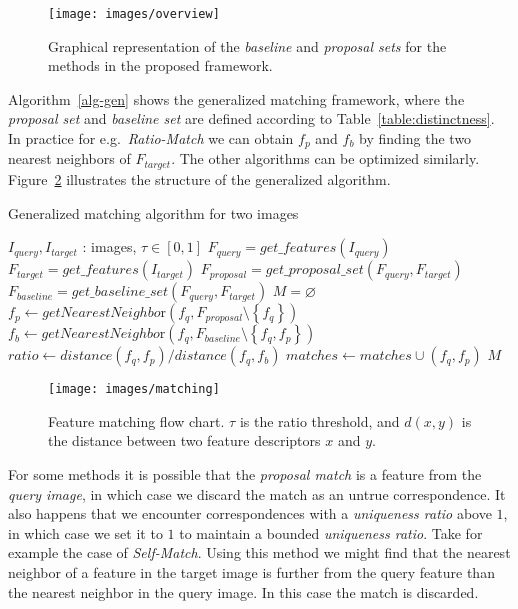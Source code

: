 \documentclass[10pt,journal,cspaper,compsoc]{IEEEtran}
\begin{document}
\begin{figure}[htb]
\centering
\texttt{[image: images/overview]}
\caption{Graphical representation of the \emph{baseline} and 
\emph{proposal sets} for the methods in the proposed framework.}
\label{fig:overview}
\end{figure}


Algorithm~\ref{alg-gen} shows the generalized matching framework, 
where the \emph{proposal set} and \emph{baseline set} are defined 
according to Table~\ref{table:distinctness}.  In practice for e.g.\ 
\emph{Ratio-Match} we can obtain $f_p$ and $f_b$ by finding the two 
nearest neighbors of $F_{target}$. The other algorithms can be optimized 
similarly. Figure~\ref{fig:matching} illustrates the structure of 
the generalized algorithm.

\begin{algorithm}[htb]
\caption{Generalized matching algorithm for two images}
\label{alg-gen}
\begin{algorithmic}
    \Require $I_{query}, I_{target}$ : images, $\tau \in [0,1]$
    \State $F_{query} = get\_features(I_{query})$
    \State $F_{target} = get\_features(I_{target})$
\State $F_{proposal} = get\_proposal\_set(F_{query}, F_{target})$
\State $F_{baseline} = get\_baseline\_set(F_{query}, F_{target})$
\State $M = \varnothing$
    \State $f_p \gets getNearestNeighbo\text{r}(f_q, F_{proposal} \setminus 
    \left\{f_q\right\})$
    \State $f_b \gets getNearestNeighbo\text{r}(f_q, F_{baseline} \setminus 
    \left\{f_q, f_p\right\})$
    \State $ratio \gets distance(f_q, f_p) / distance(f_q, f_b)$
    \If{$(ratio < \tau) \wedge (f_p \in F_{target})$}
        \State $matches \gets matches \cup \left(f_q, f_p\right)$
	\EndIf
\EndFor
\Return $M$
\end{algorithmic}
\end{algorithm}


\begin{figure}[htb]
\centering
\texttt{[image: images/matching]}
\caption{Feature matching flow chart. $\tau$ 
is the ratio threshold, and $d(x,y)$ is the distance between two feature 
descriptors $x$ and $y$.}
\label{fig:matching}
\end{figure}
%

For some methods it is possible that the \emph{proposal match} is a 
feature from the \emph{query image}, in which case we discard the match 
as an untrue correspondence.  It also happens that we encounter 
correspondences with a \emph{uniqueness ratio} above $1$, in which case we set 
it to $1$ to maintain a bounded \emph{uniqueness ratio}.  Take for example the 
case of \emph{Self-Match}. Using this method we might find that the 
nearest neighbor of a feature in the target image is further from the 
query feature than the nearest neighbor in the query image. In this case 
the match is discarded.
\end{document}
